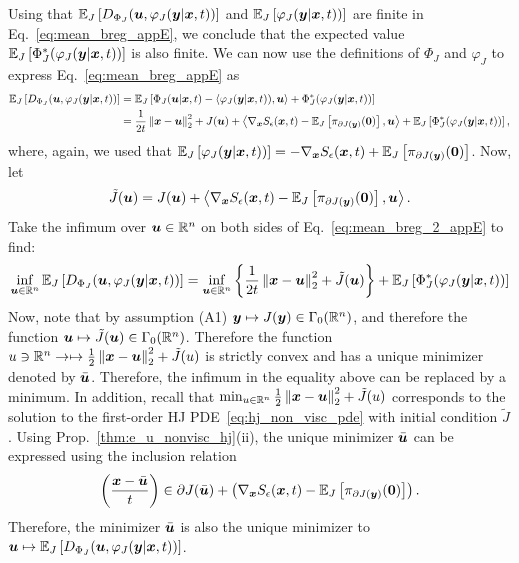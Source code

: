 Using that $\mathbb{E}_{J}\left [{D_{\Phi_{J}}(\boldsymbol{u},\varphi_{J}(\boldsymbol{y}|\boldsymbol{x},t))}\right]$ and $\mathbb{E}_{J}\left [{\varphi_{J}(\boldsymbol{y}|\boldsymbol{x},t))}\right]$ are finite in Eq.~\eqref{eq:mean_breg_appE}, we conclude that the expected value $\mathbb{E}_{J}\left [{\Phi_{J}^{*}(\varphi_{J}(\boldsymbol{y}|\boldsymbol{x},t))}\right]$ is also finite. We can now use the definitions of $\Phi_J$ and $\varphi_J$ to express Eq.~\eqref{eq:mean_breg_appE} as
\begin{equation}\label{eq:mean_breg_2_appE}
\begin{alignedat}{1}
\mathbb{E}_{J}\left [{D_{\Phi_{J}}(\boldsymbol{u},\varphi_{J}(\boldsymbol{y}|\boldsymbol{x},t))}\right] &= \mathbb{E}_{J}\left [{\Phi_{J}(\boldsymbol{u}|\boldsymbol{x},t)-\left\langle \varphi_{J}(\boldsymbol{y}|\boldsymbol{x},t)),\boldsymbol{u}\right\rangle +\Phi_{J}^{*}(\varphi_{J}(\boldsymbol{y}|\boldsymbol{x},t))}\right]\\
&= \frac{1}{2t}\left\Vert{\boldsymbol{x}-\boldsymbol{u}} \right\Vert_{2}^{2} + J(\boldsymbol{u}) + \left\langle \nabla_{\boldsymbol{x}}S_\epsilon(\boldsymbol{x},t) - \mathbb{E}_{J}\left [{\pi_{\partial J(\boldsymbol{y})}(\boldsymbol{0})}\right],\boldsymbol{u}\right\rangle + \mathbb{E}_{J}\left [{\Phi_{J}^{*}(\varphi_{J}(\boldsymbol{y}|\boldsymbol{x},t))}\right],
\end{alignedat}
\end{equation}
where, again, we used that $\mathbb{E}_{J}\left [{\varphi_{J}(\boldsymbol{y}|\boldsymbol{x},t))}\right] = -\nabla_{\boldsymbol{x}}S_\epsilon(\boldsymbol{x},t) +  \mathbb{E}_{J}\left [{\pi_{\partial J(\boldsymbol{y})}(\boldsymbol{0})}\right]$.
Now, let 
\[
\tilde{J}(\boldsymbol{u}) = J(\boldsymbol{u}) + \left\langle \nabla_{\boldsymbol{x}}S_\epsilon(\boldsymbol{x},t) - \mathbb{E}_{J}\left [{\pi_{\partial J(\boldsymbol{y})}(\boldsymbol{0})}\right],\boldsymbol{u}\right\rangle.
\] 
Take the infimum over $\boldsymbol{u} \in \mathbb{R}^n$ on both sides of Eq.~\eqref{eq:mean_breg_2_appE} to find:
\begin{equation*}
    \inf_{\boldsymbol{u}\in\mathbb{R}^n}\mathbb{E}_{J}\left [{D_{\Phi_{J}}(\boldsymbol{u},\varphi_{J}(\boldsymbol{y}|\boldsymbol{x},t))}\right] = \inf_{\boldsymbol{u}\in\mathbb{R}^n}\left\{\frac{1}{2t}\left\Vert{\boldsymbol{x}-\boldsymbol{u}} \right\Vert_{2}^{2} + \tilde{J}(\boldsymbol{u})\right\} + \mathbb{E}_{J}\left [{\Phi_{J}^{*}(\varphi_{J}(\boldsymbol{y}|\boldsymbol{x},t))}\right]
\end{equation*}
Now, note that by assumption (A1) $\boldsymbol{y} \mapsto J(\boldsymbol{y}) \in \Gamma_0(\mathbb{R}^n)$, and therefore the function $\boldsymbol{u} \mapsto \tilde{J}(\boldsymbol{u}) \in \Gamma_0(\mathbb{R}^n)$. Therefore the function $u \ni \mathbb{R}^n \to \mapsto \frac{1}{2}\left\Vert{\boldsymbol{x}-\boldsymbol{u}} \right\Vert_{2}^{2} + \tilde{J}(u)$ is strictly convex and has a unique minimizer denoted by $\bar{\boldsymbol{u}}$. Therefore, the infimum in the equality above can be replaced by a minimum. In addition, recall that $\min_{u \in \mathbb{R}^n}
{\frac{1}{2}\left\Vert{\boldsymbol{x}-\boldsymbol{u}} \right\Vert_{2}^{2} + \tilde{J}(u)}
$ corresponds to the solution to the first-order HJ PDE~\eqref{eq:hj_non_visc_pde} with initial condition $\tilde{J}$. Using Prop.~\ref{thm:e_u_nonvisc_hj}(ii), the unique minimizer $\bar{\boldsymbol{u}}$ can be expressed using the inclusion relation
\begin{equation}\label{eq:inclusion_appE}
\left(\frac{\boldsymbol{x} - \bar{\boldsymbol{u}}}{t}\right) \in \partial J(\bar{\boldsymbol{u}}) + \left(\nabla_{\boldsymbol{x}}S_\epsilon(\boldsymbol{x},t) - \mathbb{E}_{J}\left [{\pi_{\partial J(\boldsymbol{y})}(\boldsymbol{0})}\right]\right).
\end{equation}
Therefore, the minimizer $\bar{\boldsymbol{u}}$ is also the unique minimizer to $\boldsymbol{u} \mapsto \mathbb{E}_{J}\left [{D_{\Phi_{J}}(\boldsymbol{u},\varphi_{J}(\boldsymbol{y}|\boldsymbol{x},t))}\right]$.


